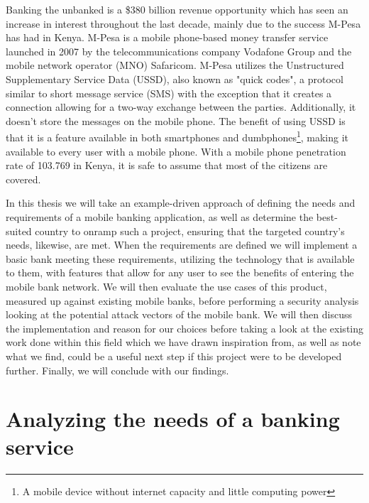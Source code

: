 \documentclass[11pt, a4paper]{article}
\begin{document}
Banking the unbanked is a \$380 billion revenue opportunity\cite{accenture} which has seen an increase in interest throughout the last decade, mainly due to the success M-Pesa has had in Kenya. M-Pesa is a mobile phone-based money transfer service launched in 2007 by the telecommunications company Vodafone Group and the mobile network operator (MNO) Safaricom. M-Pesa utilizes the Unstructured Supplementary Service Data (USSD), also known as "quick codes", a protocol similar to short message service (SMS) with the exception that it creates a connection allowing for a two-way exchange between the parties. Additionally, it doesn't store the messages on the mobile phone. The benefit of using USSD is that it is a feature available in both smartphones and dumbphones\footnote{A mobile device without internet capacity and little computing power}, making it available to every user with a mobile phone. With a mobile phone penetration rate of 103.769\cite{wbinternet} in Kenya, it is safe to assume that most of the citizens are covered.


In this thesis we will take an example-driven approach of defining the needs and requirements of a mobile banking application, as well as determine the best-suited country to onramp such a project, ensuring that the targeted country's needs, likewise, are met. When the requirements are defined we will implement a basic bank meeting these requirements, utilizing the technology that is available to them, with features that allow for any user to see the benefits of entering the mobile bank network. We will then evaluate the use cases of this product, measured up against existing mobile banks, before performing a security analysis looking at the potential attack vectors of the mobile bank. We will then discuss the implementation and reason for our choices before taking a look at the existing work done within this field which we have drawn inspiration from, as well as note what we find, could be a useful next step if this project were to be developed further. Finally, we will conclude with our findings.


\clearpage
\section{Analyzing the needs of a banking service}
\end{document}
